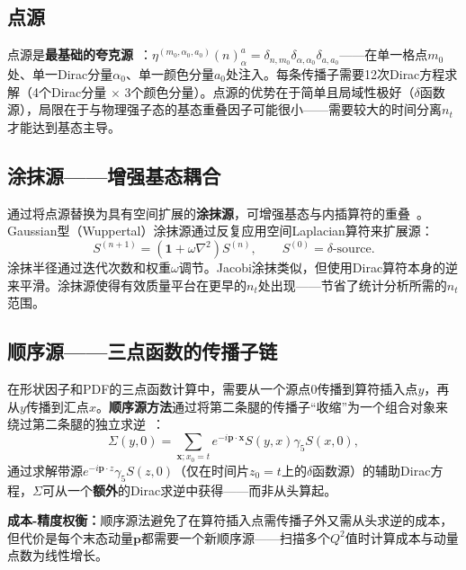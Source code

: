 \documentclass[12pt,a4paper]{ctexart}
\theoremstyle{definition}
\begin{document}
\subsection{点源}

点源是\textbf{最基础的夸克源}~\cite{GattringerLang2010}：$\eta^{(m_0,\alpha_0,a_0)}(n)_{\alpha}^a = \delta_{n,m_0}\delta_{\alpha,\alpha_0}\delta_{a,a_0}$——在单一格点$m_0$处、单一Dirac分量$\alpha_0$、单一颜色分量$a_0$处注入。每条传播子需要12次Dirac方程求解（4个Dirac分量 $\times$ 3个颜色分量）。点源的优势在于简单且局域性极好（$\delta$函数源），局限在于与物理强子态的基态重叠因子可能很小——需要较大的时间分离$n_t$才能达到基态主导。

\subsection{涂抹源——增强基态耦合}

通过将点源替换为具有空间扩展的\textbf{涂抹源}，可增强基态与内插算符的重叠~\cite{GattringerLang2010}。Gaussian型（Wuppertal）涂抹源通过反复应用空间Laplacian算符来扩展源：
\begin{equation}
S^{(n+1)} = (\mathbf{1} + \omega \nabla^2) S^{(n)}, \qquad S^{(0)} = \delta\text{-source}.
\label{eq:gaussian_smearing}
\end{equation}
涂抹半径通过迭代次数和权重$\omega$调节。Jacobi涂抹类似，但使用Dirac算符本身的逆来平滑。涂抹源使得有效质量平台在更早的$n_t$处出现——节省了统计分析所需的$n_t$范围。

\subsection{顺序源——三点函数的传播子链}

在形状因子和PDF的三点函数计算中，需要从一个源点$0$传播到算符插入点$y$，再从$y$传播到汇点$x$。\textbf{顺序源方法}通过将第二条腿的传播子``收缩''为一个组合对象来绕过第二条腿的独立求逆~\cite{GattringerLang2010}：
\begin{equation}
\Sigma(y,0) = \sum_{\mathbf{x}; x_0=t} e^{-i\mathbf{p}\cdot\mathbf{x}} S(y,x) \gamma_5 S(x,0),
\label{eq:sequential_source}
\end{equation}
通过求解带源$e^{-i\mathbf{p}\cdot z}\gamma_5 S(z,0)$（仅在时间片$z_0=t$上的$\delta$函数源）的辅助Dirac方程，$\Sigma$可从一个\textbf{额外}的Dirac求逆中获得——而非从头算起。

\textbf{成本-精度权衡：}顺序源法避免了在算符插入点需传播子外又需从头求逆的成本，但代价是每个末态动量$\mathbf{p}$都需要一个新顺序源——扫描多个$Q^2$值时计算成本与动量点数为线性增长。
\end{document}
